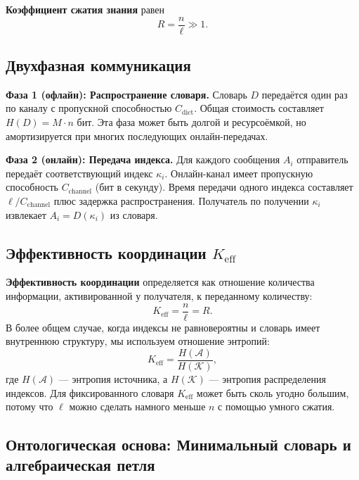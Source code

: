 \documentclass[12pt,a4paper]{article}
\theoremstyle{remark}
\newcommand{\Keff}{K_{\mathrm{eff}}}
\begin{document}
	\textbf{Коэффициент сжатия знания} равен
	\begin{equation}
		R = \frac{n}{\ell} \gg 1.
	\end{equation}
	
	\subsection{Двухфазная коммуникация}
	
	\textbf{Фаза 1 (офлайн): Распространение словаря.} Словарь $D$ передаётся один раз по каналу с пропускной способностью $C_{\text{dict}}$. Общая стоимость составляет $H(D) = M \cdot n$ бит. Эта фаза может быть долгой и ресурсоёмкой, но амортизируется при многих последующих онлайн-передачах.
	
	\textbf{Фаза 2 (онлайн): Передача индекса.} Для каждого сообщения $A_i$ отправитель передаёт соответствующий индекс $\kappa_i$. Онлайн-канал имеет пропускную способность $C_{\text{channel}}$ (бит в секунду). Время передачи одного индекса составляет $\ell / C_{\text{channel}}$ плюс задержка распространения. Получатель по получении $\kappa_i$ извлекает $A_i = D(\kappa_i)$ из словаря.
	
	\subsection{Эффективность координации $\Keff$}
	\label{sec:keff-def}
	
	\textbf{Эффективность координации} определяется как отношение количества информации, активированной у получателя, к переданному количеству:
	\begin{equation}
		\Keff = \frac{n}{\ell} = R. \label{eq:keff-def}
	\end{equation}
	В более общем случае, когда индексы не равновероятны и словарь имеет внутреннюю структуру, мы используем отношение энтропий:
	\begin{equation}
		\Keff = \frac{H(\mathcal{A})}{H(\mathcal{K})},
	\end{equation}
	где $H(\mathcal{A})$ — энтропия источника, а $H(\mathcal{K})$ — энтропия распределения индексов. Для фиксированного словаря $\Keff$ может быть сколь угодно большим, потому что $\ell$ можно сделать намного меньше $n$ с помощью умного сжатия.
	
	\subsection{Онтологическая основа: Минимальный словарь и алгебраическая петля}
	\label{subsec:minimal-dict}
	
\end{document}

